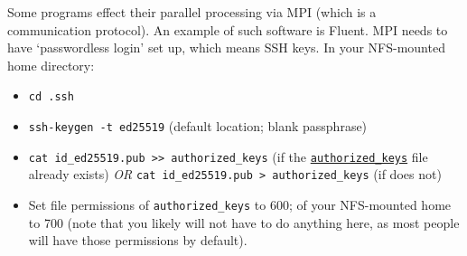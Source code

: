 \label{sect:ssh-mpi}

Some programs effect their parallel processing via MPI (which is a 
communication protocol). An example of such software is Fluent. MPI needs to 
have `passwordless login' set up, which means SSH keys. In your NFS-mounted 
home directory:

\begin{itemize}
\item
\texttt{cd .ssh}
\item
\texttt{ssh-keygen -t ed25519} (default location; blank passphrase) 
\item
\texttt{cat id\_ed25519.pub >> authorized\_keys} (if the \texttt{\href{https://www.ssh.com/academy/ssh/authorized-keys-file}{authorized\_keys}}
file already exists) \emph{OR} \texttt{cat id\_ed25519.pub > authorized\_keys} (if does not) 
\item
Set file permissions of \texttt{authorized\_keys} to 600; of your NFS-mounted home
to 700 (note that you likely will not have to do anything here, as most people
will have those permissions by default). 
\end{itemize}
